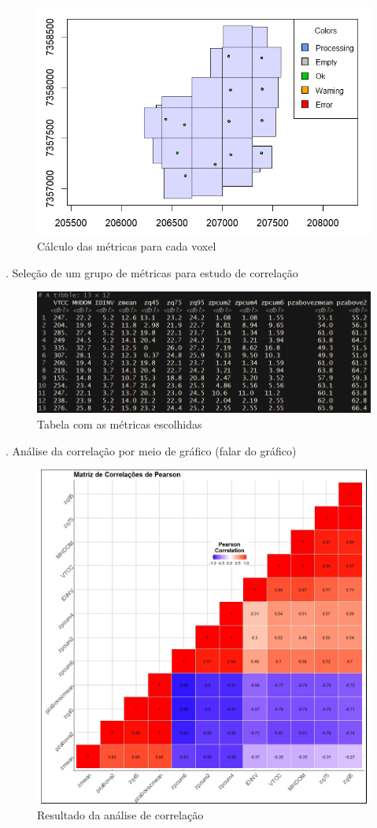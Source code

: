 \documentclass[
]{article}
\begin{document}
\begin{figure}

{\centering \includegraphics[width=0.5\linewidth]{IMAGES/calculo-metricas-voxel} 

}

\caption{Cálculo das métricas para cada voxel}\label{fig:unnamed-chunk-14}
\end{figure}

. Seleção de um grupo de métricas para estudo de correlação

\begin{figure}

{\centering \includegraphics[width=0.5\linewidth]{IMAGES/tb-subgrupo-de-metricas-p-analise} 

}

\caption{Tabela com as métricas escolhidas}\label{fig:unnamed-chunk-15}
\end{figure}

. Análise da correlação por meio de gráfico (falar do gráfico)

\begin{figure}

{\centering \includegraphics[width=0.5\linewidth]{IMAGES/MatrizDeCorrelacoes} 

}

\caption{Resultado da análise de correlação}\label{fig:unnamed-chunk-16}
\end{figure}
\end{document}

